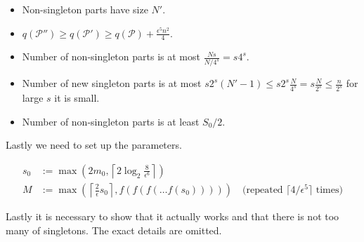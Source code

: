 \begin{itemize}
	\item Non-singleton parts have size $N'$.
	\item $q(\mathcal{P}'') \geq q(\mathcal{P}') \geq q(\mathcal{P}) + \frac{\epsilon^5 n^2}{4}$.
	\item Number of non-singleton parts is at most $\frac{Ns}{N/4^s} = s4^s$.
	\item Number of new singleton parts is at most $s2^s(N' - 1) \leq s2^s \frac{N}{4^s} = s \frac{N}{2^s} \leq \frac{n}{2^s}$ for large $s$ it is small.
	\item Number of non-singleton parts is at least $S_0 / 2$.
\end{itemize}

Lastly we need to set up the parameters.

$$
\begin{aligned}
	s_0 &:= \max \left( 2m_0, \left\lceil 2\log_2 \frac{8}{\epsilon^6} \right\rceil \right)\\
	M &:= \max \left( \left\lceil \frac{2}{\epsilon} s_0 \right\rceil, f(f(f(\dots f(s_0)))) \right) \quad \text{(repeated } \lceil 4/\epsilon^5 \rceil \text{ times)}
\end{aligned}
$$

Lastly it is necessary to show that it actually works and that there is not too many of singletons. The exact details are omitted.